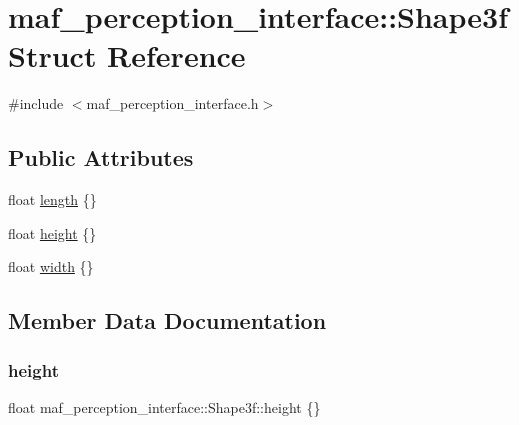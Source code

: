 \hypertarget{structmaf__perception__interface_1_1Shape3f}{}\section{maf\+\_\+perception\+\_\+interface\+:\+:Shape3f Struct Reference}
\label{structmaf__perception__interface_1_1Shape3f}


{\ttfamily \#include $<$maf\+\_\+perception\+\_\+interface.\+h$>$}

\subsection*{Public Attributes}
\begin{DoxyCompactItemize}
\item 
float \hyperlink{structmaf__perception__interface_1_1Shape3f_a039e08455970adab2d4f369ddcc2ed43}{length} \{\}
\item 
float \hyperlink{structmaf__perception__interface_1_1Shape3f_a49962d8f15c55a0609f48504828648cc}{height} \{\}
\item 
float \hyperlink{structmaf__perception__interface_1_1Shape3f_a1a8b92bd677a9ec11aa6aa80b1269592}{width} \{\}
\end{DoxyCompactItemize}


\subsection{Member Data Documentation}
\mbox{\label{structmaf__perception__interface_1_1Shape3f_a49962d8f15c55a0609f48504828648cc}} 
\subsubsection{\texorpdfstring{height}{height}}
{\footnotesize\ttfamily float maf\+\_\+perception\+\_\+interface\+::\+Shape3f\+::height \{\}}

\mbox{\label{structmaf__perception__interface_1_1Shape3f_a039e08455970adab2d4f369ddcc2ed43}} 
